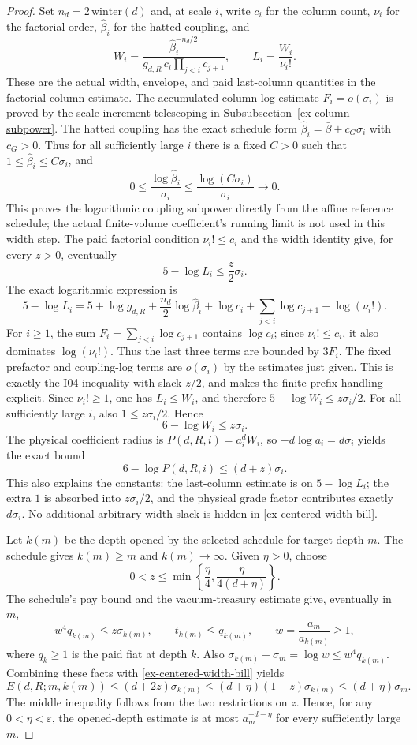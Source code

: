 \begin{proof}
Set $n_d=2\,\mathrm{winter}(d)$ and, at scale $i$, write $c_i$ for the column count, $\nu_i$ for the factorial order, $\widehat\beta_i$ for the hatted coupling, and
\[
 W_i=\frac{\widehat\beta_i^{-n_d/2}}{g_{d,R}\,c_i\prod_{j<i}c_{j+1}},
 \qquad L_i=\frac{W_i}{\nu_i!}.
\]
These are the actual width, envelope, and paid last-column quantities in the factorial-column estimate. The accumulated column-log estimate $F_i=o(\sigma_i)$ is proved by the scale-increment telescoping in Subsubsection~\ref{ex-column-subpower}. The hatted coupling has the exact schedule form $\widehat\beta_i=\bar\beta+c_G\sigma_i$ with $c_G>0$. Thus for all sufficiently large $i$ there is a fixed $C>0$ such that $1\leq\widehat\beta_i\leq C\sigma_i$, and
\[
 0\leq\frac{\log\widehat\beta_i}{\sigma_i}
 \leq\frac{\log(C\sigma_i)}{\sigma_i}\longrightarrow0.
\]
This proves the logarithmic coupling subpower directly from the affine reference schedule; the actual finite-volume coefficient's running limit is not used in this width step. The paid factorial condition $\nu_i!\leq c_i$ and the width identity give, for every $z>0$, eventually
\[
 5-\log L_i\leq\frac z2\sigma_i.
\]
The exact logarithmic expression is
\[
 5-\log L_i=5+\log g_{d,R}+\frac{n_d}{2}\log\widehat\beta_i
   +\log c_i+\sum_{j<i}\log c_{j+1}+\log(\nu_i!).
\]
For $i\geq1$, the sum $F_i=\sum_{j<i}\log c_{j+1}$ contains $\log c_i$; since $\nu_i!\leq c_i$, it also dominates $\log(\nu_i!)$. Thus the last three terms are bounded by $3F_i$. The fixed prefactor and coupling-log terms are $o(\sigma_i)$ by the estimates just given. This is exactly the I04 inequality with slack $z/2$, and makes the finite-prefix handling explicit.
Since $\nu_i!\geq1$, one has $L_i\leq W_i$, and therefore $5-\log W_i\leq z\sigma_i/2$. For all sufficiently large $i$, also $1\leq z\sigma_i/2$. Hence
\[
 6-\log W_i\leq z\sigma_i.
\]
The physical coefficient radius is $P(d,R,i)=a_i^d W_i$, so $-d\log a_i=d\sigma_i$ yields the exact bound
\begin{equation}\label{ex-centered-width-bill}
 6-\log P(d,R,i)\leq(d+z)\sigma_i.
\end{equation}
This also explains the constants: the last-column estimate is on $5-\log L_i$; the extra $1$ is absorbed into $z\sigma_i/2$, and the physical grade factor contributes exactly $d\sigma_i$. No additional arbitrary width slack is hidden in \eqref{ex-centered-width-bill}.

Let $k(m)$ be the depth opened by the selected schedule for target depth $m$. The schedule gives $k(m)\geq m$ and $k(m)\to\infty$. Given $\eta>0$, choose
\[
  0<z\leq\min\left\{\frac{\eta}{4},\frac{\eta}{4(d+\eta)}\right\}.
\]
The schedule's pay bound and the vacuum-treasury estimate give, eventually in $m$,
\[
 w^4q_{k(m)}\leq z\sigma_{k(m)},\qquad t_{k(m)}\leq q_{k(m)},
 \qquad w=\frac{a_m}{a_{k(m)}}\geq1,
\]
where $q_k\geq1$ is the paid fiat at depth $k$. Also $\sigma_{k(m)}-\sigma_m=\log w\leq w^4q_{k(m)}$. Combining these facts with \eqref{ex-centered-width-bill} yields
\[
 E(d,R;m,k(m))\leq(d+2z)\sigma_{k(m)}
 \leq(d+\eta)(1-z)\sigma_{k(m)}
 \leq(d+\eta)\sigma_m.
\]
The middle inequality follows from the two restrictions on $z$. Hence, for any $0<\eta<\varepsilon$, the opened-depth estimate is at most $a_m^{-d-\eta}$ for every sufficiently large $m$.


\end{proof}
